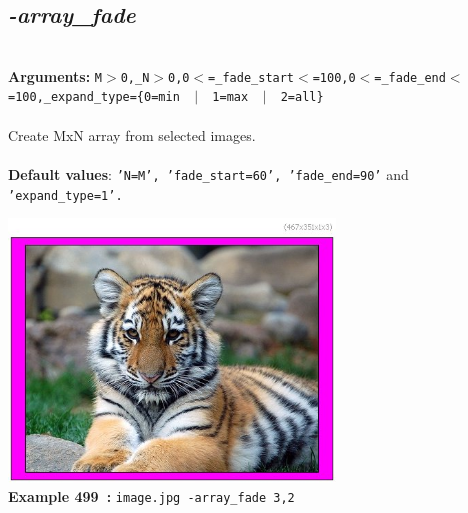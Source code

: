 \documentclass[a4paper,11pt,twoside]{book}
\begin{document}
\subsection{\emph{-array\_fade} }\vspace*{-0.5em}
~\\\textbf{Arguments: } 
{\small \texttt{M$>$0,\_N$>$0,0$<$=\_fade\_start$<$=100,0$<$=\_fade\_end$<$=100,\_expand\_type=\{0=min ~$|$~ 1=max ~$|$~ 2=all\}}}\\~\\
Create MxN array from selected images.
~\\~\\\textbf{Default values}: {\small \texttt{'N=M', 'fade\_start=60', 'fade\_end=90'} and \texttt{'expand\_type=1'.}}
\begin{center}\includegraphics[keepaspectratio=true,height=7cm,width=\textwidth]{img/gmic_def499.jpg}\\
{\footnotesize \textbf{Example 499~:} \texttt{image.jpg -array\_fade 3,2}}
\end{center}
\end{document}
